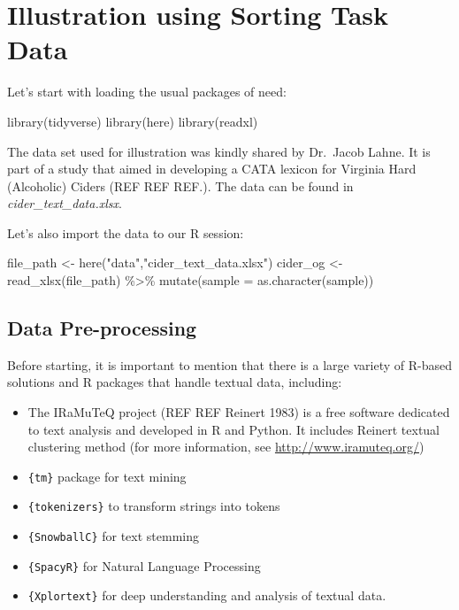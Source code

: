 \documentclass[
]{krantz}
\makeatletter
\newenvironment{Shaded}{\begin{snugshade}}{\end{snugshade}}
\newcommand{\AttributeTok}[1]{\textcolor[rgb]{0.61,0.61,0.61}{#1}}
\newcommand{\FunctionTok}[1]{\textcolor[rgb]{0,0,0}{#1}}
\newcommand{\NormalTok}[1]{#1}
\newcommand{\OtherTok}[1]{\textcolor[rgb]{0.37,0.37,0.37}{#1}}
\newcommand{\SpecialCharTok}[1]{\textcolor[rgb]{0,0,0}{#1}}
\newcommand{\StringTok}[1]{\textcolor[rgb]{0.5,0.5,0.5}{#1}}
\providecommand{\tightlist}{%
  \setlength{\itemsep}{0pt}\setlength{\parskip}{0pt}}
\newenvironment{kframe}{%
\medskip{}
\setlength{\fboxsep}{.8em}
 \def\at@end@of@kframe{}%
 \ifinner\ifhmode%
  \def\at@end@of@kframe{\end{minipage}}%
  \begin{minipage}{\columnwidth}%
 \fi\fi%
 \def\FrameCommand##1{\hskip\@totalleftmargin \hskip-\fboxsep
 \colorbox{shadecolor}{##1}\hskip-\fboxsep
     \hskip-\linewidth \hskip-\@totalleftmargin \hskip\columnwidth}%
 \MakeFramed {\advance\hsize-\width
   \@totalleftmargin\z@ \linewidth\hsize
   \@setminipage}}%
 {\par\unskip\endMakeFramed%
 \at@end@of@kframe}
\renewenvironment{Shaded}{\begin{kframe}}{\end{kframe}}
\makeatother
\begin{document}
\hypertarget{illustration-using-sorting-task-data}{%
\section{Illustration using Sorting Task Data}\label{illustration-using-sorting-task-data}}

Let's start with loading the usual packages of need:

\begin{Shaded}
\begin{Highlighting}[]
\FunctionTok{library}\NormalTok{(tidyverse)}
\FunctionTok{library}\NormalTok{(here)}
\FunctionTok{library}\NormalTok{(readxl)}
\end{Highlighting}
\end{Shaded}

The data set used for illustration was kindly shared by Dr.~Jacob Lahne. It is part of a study that aimed in developing a CATA lexicon for Virginia Hard (Alcoholic) Ciders (REF REF REF.). The data can be found in \emph{cider\_text\_data.xlsx}.

Let's also import the data to our R session:

\begin{Shaded}
\begin{Highlighting}[]
\NormalTok{file\_path }\OtherTok{\textless{}{-}} \FunctionTok{here}\NormalTok{(}\StringTok{"data"}\NormalTok{,}\StringTok{"cider\_text\_data.xlsx"}\NormalTok{) }
\NormalTok{cider\_og }\OtherTok{\textless{}{-}} \FunctionTok{read\_xlsx}\NormalTok{(file\_path) }\SpecialCharTok{\%\textgreater{}\%} 
  \FunctionTok{mutate}\NormalTok{(}\AttributeTok{sample =} \FunctionTok{as.character}\NormalTok{(sample))}
\end{Highlighting}
\end{Shaded}

\hypertarget{data-pre-processing}{%
\subsection{Data Pre-processing}\label{data-pre-processing}}

Before starting, it is important to mention that there is a large variety of R-based solutions and R packages that handle textual data, including:

\begin{itemize}
\tightlist
\item
  The IRaMuTeQ project (REF REF Reinert 1983) is a free software dedicated to text analysis and developed in R and Python. It includes Reinert textual clustering method (for more information, see \url{http://www.iramuteq.org/})
\item
  \texttt{\{tm\}} package for text mining
\item
  \texttt{\{tokenizers\}} to transform strings into tokens
\item
  \texttt{\{SnowballC\}} for text stemming
\item
  \texttt{\{SpacyR\}} for Natural Language Processing
\item
  \texttt{\{Xplortext\}} for deep understanding and analysis of textual data.
\end{itemize}
\end{document}
